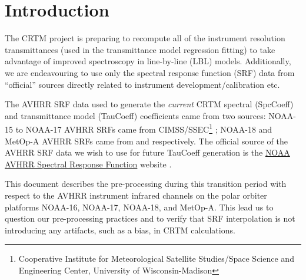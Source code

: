 \section{Introduction}
The CRTM project is preparing to recompute all of the instrument resolution transmittances (used in the transmittance model regression fitting) to take advantage of improved spectroscopy in line-by-line (LBL) models. Additionally, we are endeavouring to use only the spectral response function (SRF) data from ``official'' sources directly related to instrument development/calibration etc.

The AVHRR SRF data used to generate the \textit{current} CRTM spectral (SpcCoeff) and transmittance model (TauCoeff) coefficients came from two sources: NOAA-15 to NOAA-17 AVHRR SRFs came from CIMSS/SSEC\footnote{Cooperative Institute for Meteorological Satellite Studies/Space Science and Engineering Center, University of Wisconsin-Madison} \citep{CIMSS_SRFs}; NOAA-18 and MetOp-A AVHRR SRFs came from \citet{Sullivan_avhrr3_n18_srf} and \citet{Sullivan_avhrr3_metop-a_srf} respectively. 
The official source of the AVHRR SRF data we wish to use for future TauCoeff generation is the  \href{http://www.star.nesdis.noaa.gov/smcd/spb/fwu/solar_cal/spec_resp_func}{NOAA AVHRR Spectral Response Function} website \citep{NESDIS_AVHRR_SRFs}.

This document describes the pre-processing during this transition period with respect to the AVHRR instrument infrared channels on the polar orbiter platforms NOAA-16, NOAA-17, NOAA-18, and MetOp-A. This lead us to question our pre-processing practices and to verify that SRF interpolation is not introducing any artifacts, such as a bias, in CRTM calculations.

